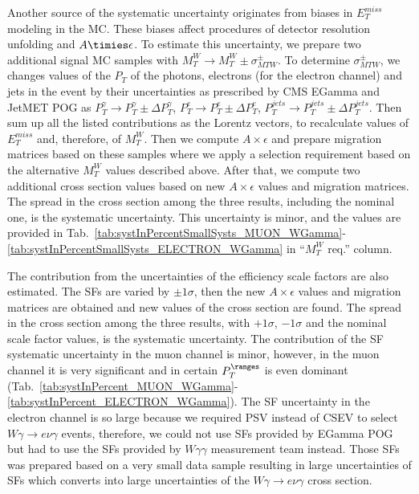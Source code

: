 
Another source of the systematic uncertainty originates from biases in $E_T^{miss}$ modeling in the MC. These biases affect procedures of detector resolution unfolding and $A\timies\epsilon$. To estimate this uncertainty, we prepare two additional signal MC samples with $M_T^{W} \rightarrow M_T^W \pm \sigma^{\pm}_{MTW}$. To determine $\sigma^{\pm}_{MTW}$, we changes values of the $P_T$ of the photons, electrons (for the electron channel) and jets in the event by their uncertainties as prescribed by CMS EGamma and JetMET POG as $P_T^{\gamma}\rightarrow P_T^{\gamma} \pm \Delta P_T^{\gamma}$, $P_T^{e}\rightarrow P_T^{e} \pm \Delta P_T^{e}$, $P_T^{jets}\rightarrow P_T^{jets} \pm \Delta P_T^{jets}$. Then sum up all the listed contributions as the Lorentz vectors, to recalculate values of $E_T^{miss}$ and, therefore, of $M_T^{W}$. Then we compute $A \times \epsilon$ and prepare migration matrices based on these samples where we apply a selection requirement based on the alternative $M_T^{W}$ values described above. After that, we compute two additional cross section values based on new $A\times\epsilon$ values and migration matrices. The spread in the cross section among the three results, including the nominal one, is the systematic uncertainty. This uncertainty is minor, and the values are provided in Tab.~\ref{tab:systInPercentSmallSysts_MUON_WGamma}-\ref{tab:systInPercentSmallSysts_ELECTRON_WGamma} in ``$M_T^W$ req.'' column.


The contribution from the uncertainties of the efficiency scale factors are also estimated. The SFs are varied by $\pm 1\sigma$, then the new $A \times \epsilon$ values and migration matrices are obtained and new values of the cross section are found. The spread in the cross section among the three results, with $+1\sigma$, $-1\sigma$ and the nominal scale factor values, is the systematic uncertainty. The contribution of the SF systematic uncertainty in the muon channel is minor, however, in the muon channel it is very significant and in certain $P_T^{\ranges}$ is even dominant (Tab.~\ref{tab:systInPercent_MUON_WGamma}-\ref{tab:systInPercent_ELECTRON_WGamma}). The SF uncertainty in the electron channel is so large because we required PSV instead of CSEV to select $W\gamma\rightarrow e\nu\gamma$ events, therefore, we could not use SFs provided by EGamma POG but had to use the SFs provided by $W\gamma\gamma$ measurement team instead. Those SFs was prepared based on a very small data sample resulting in large uncertainties of SFs which converts into large uncertainties of the $W\gamma\rightarrow e\nu\gamma$ cross section. 

